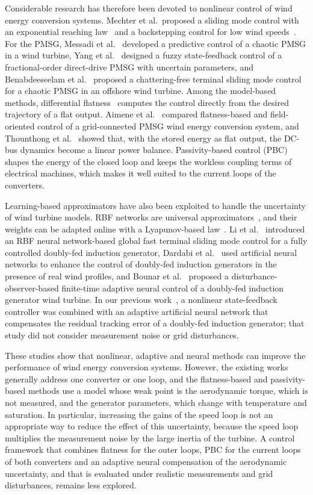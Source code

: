 \documentclass[11pt,a4paper]{article}
\begin{document}
Considerable research has therefore been devoted to nonlinear control of wind energy conversion systems.
Mechter et al.\ proposed a sliding mode control with an exponential reaching law~\cite{mechter2015} and a
backstepping control for low wind speeds~\cite{mechter2016}. For the PMSG, Messadi et al.~\cite{messadi2015}
developed a predictive control of a chaotic PMSG in a wind turbine, Yang et al.~\cite{yang2021} designed a
fuzzy state-feedback control of a fractional-order direct-drive PMSG with uncertain parameters, and
Benabdeeseelam et al.~\cite{benabdeeseelam2025} proposed a chattering-free terminal sliding mode control
for a chaotic PMSG in an offshore wind turbine. Among the model-based methods, differential
flatness~\cite{fliess1995} computes the control directly from the desired trajectory of a flat output.
Aimene et al.~\cite{aimene2022} compared flatness-based and field-oriented control of a grid-connected
PMSG wind energy conversion system, and Thounthong et al.~\cite{thounthong2010} showed that, with the
stored energy as flat output, the DC-bus dynamics become a linear power balance. Passivity-based control
(PBC)~\cite{ortega1998,ortega2002} shapes the energy of the closed loop and keeps the workless coupling
terms of electrical machines, which makes it well suited to the current loops of the converters.

Learning-based approximators have also been exploited to handle the uncertainty of wind turbine models.
RBF networks are universal approximators~\cite{park1991}, and their weights can be adapted online with a
Lyapunov-based law~\cite{lewis1999}. Li et al.~\cite{li2024} introduced an RBF neural network-based global
fast terminal sliding mode control for a fully controlled doubly-fed induction generator, Dardabi et al.~\cite{dardabi2024}
used artificial neural networks to enhance the control of doubly-fed induction generators in the presence
of real wind profiles, and
Bounar et al.~\cite{bounar2025} proposed a disturbance-observer-based finite-time adaptive neural control
of a doubly-fed induction generator wind turbine. In our previous work~\cite{regani2026}, a nonlinear state-feedback controller was
combined with an adaptive artificial neural network that compensates the residual tracking error of a
doubly-fed induction generator; that study did not consider measurement noise or grid disturbances.

These studies show that nonlinear, adaptive and neural methods can improve the performance of wind
energy conversion systems. However, the existing works generally address one converter or one loop, and
the flatness-based and passivity-based methods use a model whose weak point is the aerodynamic torque,
which is not measured, and the generator parameters, which change with temperature and saturation. In
particular, increasing the gains of the speed loop is not an appropriate way to reduce the effect of
this uncertainty, because the speed loop multiplies the measurement noise by the large inertia of the
turbine. A control framework that combines flatness for the outer loops, PBC for the current loops of
both converters and an adaptive neural compensation of the aerodynamic uncertainty, and that is
evaluated under realistic measurements and grid disturbances, remains less explored.
\end{document}
